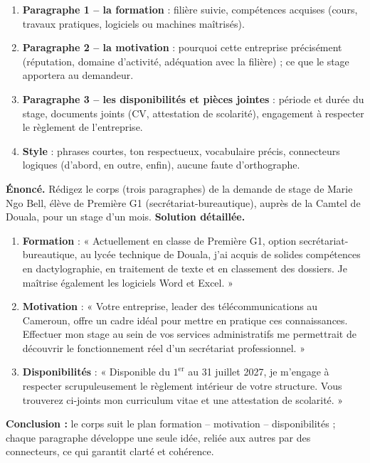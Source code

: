 \documentclass[11pt]{article}
\newcounter{popsec}
\newcounter{popsub}
\newcommand{\courssub}[1]{%
  \stepcounter{popsub}%
  \par\vspace{9pt}\noindent{\popxbold\fontsize{11.5}{13}\selectfont\color{popink}{\color{poporange}\thepopsec.\thepopsub}\hspace{6pt}#1}\par\nopagebreak\vspace{4pt}
}
\begin{document}
\courssub{Méthode 4 : Rédiger le corps de la lettre}

\begin{methode}
\begin{enumerate}
\item \textbf{Paragraphe 1 -- la formation} : filière suivie, compétences acquises (cours, travaux pratiques, logiciels ou machines maîtrisés).
\item \textbf{Paragraphe 2 -- la motivation} : pourquoi cette entreprise précisément (réputation, domaine d'activité, adéquation avec la filière) ; ce que le stage apportera au demandeur.
\item \textbf{Paragraphe 3 -- les disponibilités et pièces jointes} : période et durée du stage, documents joints (CV, attestation de scolarité), engagement à respecter le règlement de l'entreprise.
\item \textbf{Style} : phrases courtes, ton respectueux, vocabulaire précis, connecteurs logiques (d'abord, en outre, enfin), aucune faute d'orthographe.
\end{enumerate}
\end{methode}

\begin{exoresolu}
\textbf{Énoncé.} Rédigez le corps (trois paragraphes) de la demande de stage de Marie Ngo Bell, élève de Première G1 (secrétariat-bureautique), auprès de la Camtel de Douala, pour un stage d'un mois.
\tcblower
\textbf{Solution détaillée.}
\begin{enumerate}
\item \textbf{Formation} : « Actuellement en classe de Première G1, option secrétariat-bureautique, au lycée technique de Douala, j'ai acquis de solides compétences en dactylographie, en traitement de texte et en classement des dossiers. Je maîtrise également les logiciels Word et Excel. »
\item \textbf{Motivation} : « Votre entreprise, leader des télécommunications au Cameroun, offre un cadre idéal pour mettre en pratique ces connaissances. Effectuer mon stage au sein de vos services administratifs me permettrait de découvrir le fonctionnement réel d'un secrétariat professionnel. »
\item \textbf{Disponibilités} : « Disponible du $1^{\text{er}}$ au 31 juillet 2027, je m'engage à respecter scrupuleusement le règlement intérieur de votre structure. Vous trouverez ci-joints mon curriculum vitae et une attestation de scolarité. »
\end{enumerate}
\textbf{Conclusion :} le corps suit le plan formation -- motivation -- disponibilités ; chaque paragraphe développe une seule idée, reliée aux autres par des connecteurs, ce qui garantit clarté et cohérence.
\end{exoresolu}
\end{document}
